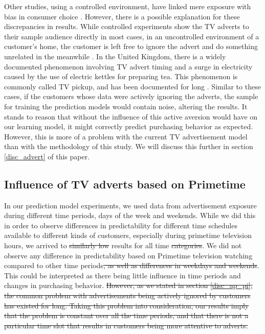 \documentclass[review]{elsarticle}
\providecommand{\DIFaddtex}[1]{{\protect\color{blue}\uwave{#1}}} %
\providecommand{\DIFdeltex}[1]{{\protect\color{red}\sout{#1}}}                      %
\providecommand{\DIFaddbegin}{} %
\providecommand{\DIFaddend}{} %
\providecommand{\DIFdelbegin}{} %
\providecommand{\DIFdelend}{} %
\providecommand{\DIFadd}[1]{\texorpdfstring{\DIFaddtex{#1}}{#1}} %
\providecommand{\DIFdel}[1]{\texorpdfstring{\DIFdeltex{#1}}{}} %
\newcommand{\DIFscaledelfig}{0.5}
\newlength{\DIFdelgraphicswidth} %
\newlength{\DIFdelgraphicsheight} %
\newcommand{\DIFaddincludegraphics}[2][]{{\color{blue}\fbox{\DIFOincludegraphics[#1]{#2}}}} %
\newcommand{\DIFdelincludegraphics}[2][]{%
\sbox{\DIFdelgraphicsbox}{\DIFOincludegraphics[#1]{#2}}%
\settoboxwidth{\DIFdelgraphicswidth}{\DIFdelgraphicsbox} %
\settoboxtotalheight{\DIFdelgraphicsheight}{\DIFdelgraphicsbox} %
\scalebox{\DIFscaledelfig}{%
\parbox[b]{\DIFdelgraphicswidth}{\usebox{\DIFdelgraphicsbox}\\[-\baselineskip] \rule{\DIFdelgraphicswidth}{0em}}\llap{\resizebox{\DIFdelgraphicswidth}{\DIFdelgraphicsheight}{%
\setlength{\unitlength}{\DIFdelgraphicswidth}%
\begin{picture}(1,1)%
\thicklines\linethickness{2pt} %
{\color[rgb]{1,0,0}\put(0,0){\framebox(1,1){}}}%
{\color[rgb]{1,0,0}\put(0,0){\line( 1,1){1}}}%
{\color[rgb]{1,0,0}\put(0,1){\line(1,-1){1}}}%
\end{picture}%
}\hspace*{3pt}}} %
} %
\DeclareRobustCommand{\DIFaddbegin}{\DIFOaddbegin \let\includegraphics\DIFaddincludegraphics} %
\DeclareRobustCommand{\DIFaddend}{\DIFOaddend \let\includegraphics\DIFOincludegraphics} %
\DeclareRobustCommand{\DIFdelbegin}{\DIFOdelbegin \let\includegraphics\DIFdelincludegraphics} %
\DeclareRobustCommand{\DIFdelend}{\DIFOaddend \let\includegraphics\DIFOincludegraphics} %
\begin{document}
Other studies, using a controlled environment, have linked mere exposure with bias in consumer choice \cite{janiszewski}. However, there is a possible explanation for these discrepancies in results. While controlled experiments show the TV adverts to their sample audience directly in most cases, in an uncontrolled environment of a customer's home, the customer is left free to ignore the advert and do something unrelated in the meanwhile \cite{abernethy}. In the United Kingdom, there is a widely documented phenomenon involving TV advert timing and a surge in electricity caused by the use of electric kettles for preparing tea. This phenomenon is commonly called TV pickup, and has been documented for long \cite{bunn,boait}. Similar to these cases, if the customers whose data were actively ignoring the adverts, the sample for training the prediction models would contain noise, altering the results. It stands to reason that without the influence of this active aversion would have on our learning model, it might correctly predict purchasing behavior as expected. However, this is more of a problem with the current TV advertisement model than with the methodology of this study. We will discuss this further in section \ref{disc_advert} of this paper.


\subsection{Influence of TV adverts based on Primetime}
\label{disc_prime}

In our prediction model experiments, we used data from advertisement exposure during different time periods, days of the week and weekends. While we did this in order to observe differences in predictability for different time schedules available to different kinds of customers, especially during primetime television hours, we arrived to \DIFdelbegin \DIFdel{similarly low }\DIFdelend \DIFaddbegin \DIFadd{similar }\DIFaddend results for all time \DIFdelbegin \DIFdel{categories}\DIFdelend \DIFaddbegin \DIFadd{data configurations}\DIFaddend . We did not observe any difference in predictability based on Primetime television watching compared to other time periods\DIFdelbegin \DIFdel{, as well as differences in weekdays and weekends}\DIFdelend . This could be interpreted as there being little influence in time periods and changes in purchasing behavior. 
\DIFdelbegin \DIFdel{However, as we stated in section \ref{disc_ap_pi}, the common problem with advertisements being actively ignored by customers has existed for long. Taking this problem into consideration, our results imply that the problem is constant over all the time periods, and that there is not a particular time slot that results in customers being more attentive to adverts.
}\DIFdelend 
\end{document}

